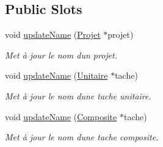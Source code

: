 \subsection*{Public Slots}
\begin{DoxyCompactItemize}
\item 
void \hyperlink{class_tree_view_model_ae3b9431925e42572a66aa51ae1ab785f}{update\+Name} (\hyperlink{class_projet}{Projet} $\ast$projet)
\begin{DoxyCompactList}\small\item\em Met à jour le nom d\textquotesingle{}un projet. \end{DoxyCompactList}\item 
void \hyperlink{class_tree_view_model_a20c0d80c255910d92ad4fac40cb3295f}{update\+Name} (\hyperlink{class_unitaire}{Unitaire} $\ast$tache)
\begin{DoxyCompactList}\small\item\em Met à jour le nom d\textquotesingle{}une tache unitaire. \end{DoxyCompactList}\item 
void \hyperlink{class_tree_view_model_a3958b72bf354014f1f233072902b5da8}{update\+Name} (\hyperlink{class_composite}{Composite} $\ast$tache)
\begin{DoxyCompactList}\small\item\em Met à jour le nom d\textquotesingle{}une tache composite. \end{DoxyCompactList}\end{DoxyCompactItemize}
